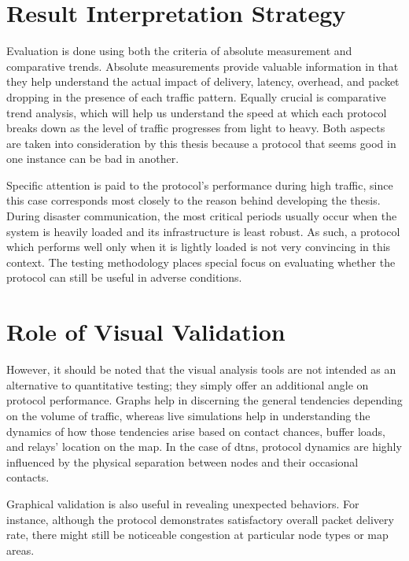 \section{Result Interpretation Strategy}
Evaluation is done using both the criteria of absolute measurement and comparative trends. Absolute measurements provide valuable information in that they help understand the actual impact of delivery, latency, overhead, and packet dropping in the presence of each traffic pattern. Equally crucial is comparative trend analysis, which will help us understand the speed at which each protocol breaks down as the level of traffic progresses from light to heavy. Both aspects are taken into consideration by this thesis because a protocol that seems good in one instance can be bad in another.

Specific attention is paid to the protocol’s performance during high traffic, since this case corresponds most closely to the reason behind developing the thesis. During disaster communication, the most critical periods usually occur when the system is heavily loaded and its infrastructure is least robust. As such, a protocol which performs well only when it is lightly loaded is not very convincing in this context. The testing methodology places special focus on evaluating whether the protocol can still be useful in adverse conditions.

\section{Role of Visual Validation}
However, it should be noted that the visual analysis tools are not intended as an alternative to quantitative testing; they simply offer an additional angle on protocol performance. Graphs help in discerning the general tendencies depending on the volume of traffic, whereas live simulations help in understanding the dynamics of how those tendencies arise based on contact chances, buffer loads, and relays' location on the map. In the case of \acp{dtn}, protocol dynamics are highly influenced by the physical separation between nodes and their occasional contacts.

Graphical validation is also useful in revealing unexpected behaviors. For instance, although the protocol demonstrates satisfactory overall packet delivery rate, there might still be noticeable congestion at particular node types or map areas.
